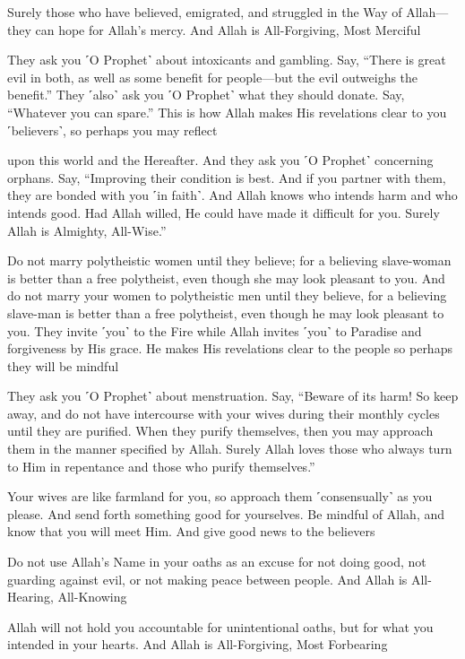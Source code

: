 Surely those who have believed, emigrated, and struggled in the Way of Allah—they can hope for Allah’s mercy. And Allah is All-Forgiving, Most Merciful

They ask you ˹O Prophet˺ about intoxicants and gambling. Say, “There is great evil in both, as well as some benefit for people—but the evil outweighs the benefit.” They ˹also˺ ask you ˹O Prophet˺ what they should donate. Say, “Whatever you can spare.” This is how Allah makes His revelations clear to you ˹believers˺, so perhaps you may reflect

upon this world and the Hereafter. And they ask you ˹O Prophet˺ concerning orphans. Say, “Improving their condition is best. And if you partner with them, they are bonded with you ˹in faith˺. And Allah knows who intends harm and who intends good. Had Allah willed, He could have made it difficult for you. Surely Allah is Almighty, All-Wise.”

Do not marry polytheistic women until they believe; for a believing slave-woman is better than a free polytheist, even though she may look pleasant to you. And do not marry your women to polytheistic men until they believe, for a believing slave-man is better than a free polytheist, even though he may look pleasant to you. They invite ˹you˺ to the Fire while Allah invites ˹you˺ to Paradise and forgiveness by His grace. He makes His revelations clear to the people so perhaps they will be mindful

They ask you ˹O Prophet˺ about menstruation. Say, “Beware of its harm! So keep away, and do not have intercourse with your wives during their monthly cycles until they are purified. When they purify themselves, then you may approach them in the manner specified by Allah. Surely Allah loves those who always turn to Him in repentance and those who purify themselves.”

Your wives are like farmland for you, so approach them ˹consensually˺ as you please. And send forth something good for yourselves. Be mindful of Allah, and know that you will meet Him. And give good news to the believers

Do not use Allah’s Name in your oaths as an excuse for not doing good, not guarding against evil, or not making peace between people. And Allah is All-Hearing, All-Knowing

Allah will not hold you accountable for unintentional oaths, but for what you intended in your hearts. And Allah is All-Forgiving, Most Forbearing

